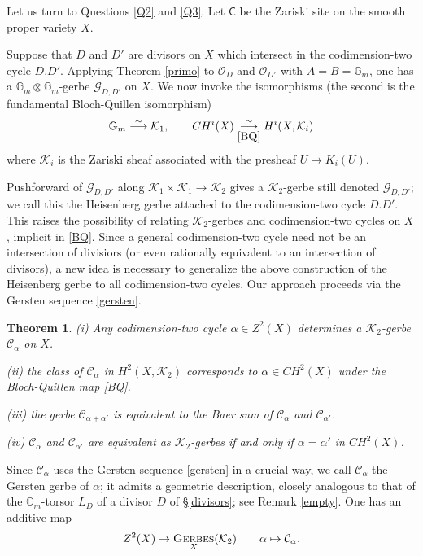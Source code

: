 \documentclass{amsart}
\numberwithin{equation}{subsection}
\newtheorem{theorem}{Theorem}[section]
\theoremstyle{remark}
\theoremstyle{remark}
\newcommand{\too}{\longrightarrow}%
\newcommand{\cC}{\mathcal{C}}
\newcommand{\cG}{\mathcal{G}}
\newcommand{\cK}{\mathcal{K}}
\newcommand{\cO}{\mathcal{O}}
\newcommand{\bbG}{\mathbb{G}}
\newcommand{\C}{\mathsf{C}} %
\DeclareMathOperator{\ger}{\textsc{Gerbes}} %
\begin{document}
Let us turn to Questions \ref{Q2} and \ref{Q3}. Let $\C$ be the Zariski site on the smooth proper variety $X$. 

Suppose that $D$ and $D'$ are divisors on $X$ which intersect in the codimension-two cycle $D.D'$. Applying Theorem \ref{primo} to $\cO_D$ and $\cO_{D'}$ with $A = B =\bbG_m$, one has a $\bbG_m \otimes \bbG_m$-gerbe $\cG_{D, D'}$ on $X$.   
We now invoke the isomorphisms (the second is the fundamental Bloch-Quillen isomorphism)
\begin{equation*}
  \bbG_m \overset{\sim}{\too} \cK_1, \qquad CH^i(X) \underset{\eqref{BQ}}{\overset{\sim}{\too}} H^i(X, \cK_i)
\end{equation*}
where $\cK_i$ is the Zariski sheaf associated with the presheaf $U \mapsto K_i(U)$. 
  
Pushforward of $\cG_{D, D'}$ along $\cK_1 \times \cK_1 \to \cK_2$ gives a $\cK_2$-gerbe still denoted $\cG_{D, D'}$; we call this the Heisenberg gerbe attached to the codimension-two cycle $D.D'$. This raises the possibility of relating $\cK_2$-gerbes and codimension-two cycles on $X$, implicit in \eqref{BQ}. Since a general codimension-two cycle need not be an intersection of divisiors (or even rationally equivalent to an intersection of divisors), a new idea is necessary to generalize the above construction of the Heisenberg gerbe to all codimension-two cycles. Our approach proceeds via the Gersten sequence \eqref{gersten}.

\begin{theorem}\label{secondo} (i) Any codimension-two cycle $\alpha \in Z^2(X)$ determines a $\cK_2$-gerbe $\cC_{\alpha}$ on $X$.

(ii) the class of $\cC_{\alpha}$ in $H^2(X, \cK_2)$ corresponds to $\alpha\in CH^2(X)$ under the Bloch-Quillen map \eqref{BQ}.

(iii)  the gerbe $\cC_{\alpha + \alpha'}$ is equivalent to the Baer sum of $\cC_{\alpha}$ and $\cC_{\alpha'}$. 

(iv) $\cC_{\alpha}$ and $\cC_{\alpha'}$ are equivalent as $\cK_2$-gerbes if and only if $\alpha =\alpha'$ in $CH^2(X)$.
\end{theorem}
Since $\cC_{\alpha}$ uses the Gersten sequence \eqref{gersten} in a crucial way, we call $\cC_{\alpha}$ the Gersten gerbe of $\alpha$; it admits a geometric description, closely analogous to that of the $\bbG_m$-torsor $L_D$ of a divisor $D$ of \S \ref{divisors}; see Remark \ref{empty}. One has an additive map 
\begin{equation}\label{zee-two} Z^2(X) \to \ger_X(\cK_2) \qquad \alpha \mapsto \cC_{\alpha}.\end{equation}
\end{document}
